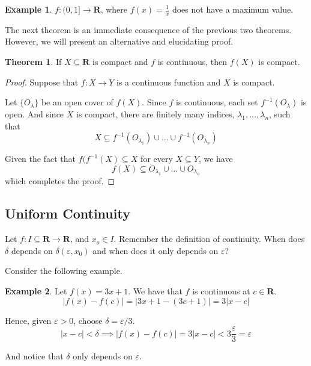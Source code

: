 \documentclass[12pt,a4paper]{article}
\theoremstyle{definition}
\newtheorem{theorem}{Theorem}[section]
\newtheorem{example}{Example}[section]
\begin{document}
\begin{example}
	$f:(0,1] \longrightarrow \textbf{R}$, where $f(x) = \frac{1}{x}$ does not have a maximum value.
\end{example}

The next theorem is an immediate consequence of the previous two theorems. However, we will present an alternative and elucidating proof.

\newpage

\begin{theorem}
	If $X \subseteq \textbf{R}$ is compact and $f$ is continuous, then $f(X)$ is compact.
\end{theorem}

\begin{proof}
	Suppose that $f : X \longrightarrow Y$ is a continuous function and $X$ is compact. 
	
	Let $\{ O_\lambda \}$ be an open cover of $f(X)$. Since $f$ is continuous, each set $f^{-1}(O_\lambda)$ is open. And since $X$ is compact, there are finitely many indices, $\lambda_1, \ldots, \lambda_n$, such that
	\[
		X \subseteq f^{-1}(O_{\lambda_1}) \cup \ldots \cup f^{-1}(O_{\lambda_n})
	\]
	
	Given the fact that $f(f^{-1}(X) \subseteq X$ for every $X \subseteq Y$, we have
	\[
		f(X) \subseteq O_{\lambda_1} \cup \ldots \cup O_{\lambda_n}
	\]
	which completes the proof.
\end{proof}

\subsection{Uniform Continuity}

Let $f : I \subseteq \textbf{R} \longrightarrow \textbf{R}$, and $x_o \in I$. Remember the definition of continuity. When does $\delta$ depends on $\delta (\varepsilon, x_0)$ and when does it only depends on $\varepsilon$? 

Consider the following example.

\begin{example}
	Let $f(x) = 3x+1$. We have that $f$ is continuous at $c \in \textbf{R}$.
	\[
		| f(x) - f(c) | = | 3x+1 - (3c+1) | = 3 |x-c|
	\]
	
	Hence, given $\varepsilon > 0$, choose $\delta = \varepsilon/3$.
	\[
		| x - c | < \delta \implies | f(x) - f(c) | = 3 |x-c| < 3 \frac{\varepsilon}{3} = \varepsilon
	\]
	
	And notice that $\delta$ only depends on $\varepsilon$.
\end{example}
\end{document}

